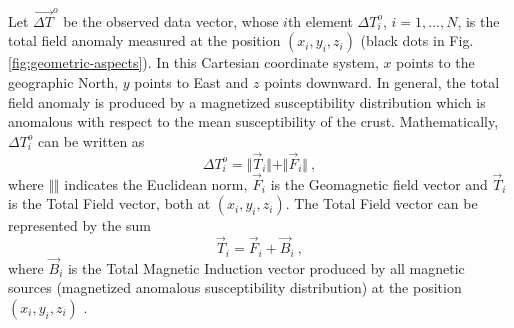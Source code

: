 \documentclass[journal abbreviation, npg]{copernicus}
\begin{document}
Let $\vec{\Delta T}^{o}$ be the observed data vector, whose $i$th element $\Delta T^{o}_{i}$, $i = 1, ..., N$, is the total field anomaly measured at the position $(x_{i}, y_{i}, z_{i})$ (black dots in Fig. \ref{fig:geometric-aspects}). In this Cartesian coordinate system, $x$ points to the geographic North, $y$ points to East and $z$ points downward. In general, the total field anomaly is produced by a magnetized  susceptibility distribution which is anomalous with respect to the mean susceptibility of the crust. Mathematically, $\Delta T^{o}_{i}$ can be written as
\begin{equation}
\Delta T^{o}_{i} = \Vert \vec{T}_i \Vert + \Vert \vec{F}_i \Vert \: ,
\label{eq:tfanomaly-i}
\end{equation}
where $\Vert \Vert$ indicates the Euclidean norm, $\vec{F}_i$ is the Geomagnetic field vector and $\vec{T}_i$ is the Total Field vector, both at $(x_{i}, y_{i}, z_{i})$. The Total Field vector can be represented by the sum
\begin{equation}
\vec{T}_i = \vec{F}_i + \vec{B}_i \: ,
\label{eq:tfvector-i}
\end{equation}
where $\vec{B}_i$ is the Total Magnetic Induction vector produced by all magnetic sources (magnetized anomalous susceptibility distribution) at the position $(x_{i}, y_{i}, z_{i})$ \citep{blakely1996, langel-hinze1998}.
\end{document}
